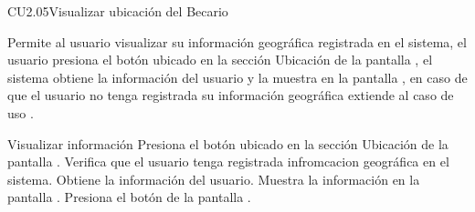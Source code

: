 
\begin{UseCase}{CU2.05}{Visualizar ubicación del Becario}{
    Permite al usuario  visualizar su información geográfica registrada en el sistema, el usuario presiona el botón   ubicado en la sección Ubicación de la pantalla , el sistema obtiene la información del usuario y la muestra en la pantalla , en caso de que el usuario no tenga registrada su información geográfica extiende al caso de uso .
       
    \bigskip
}
		
\end{UseCase}
	
	\begin{UCtrayectoria}{Visualizar información }
		\UCpaso[\UCactor]Presiona el botón  ubicado en la sección Ubicación de la pantalla . 
		\UCpaso[\UCsist] Verifica que el usuario tenga registrada infromcacion geográfica en el sistema.
		\UCpaso[\UCsist] Obtiene la información del usuario.
		\UCpaso[\UCsist] Muestra la información en la pantalla . 
        \UCpaso[\UCactor]Presiona el botón  de la pantalla .
		
	\end{UCtrayectoria}
	


